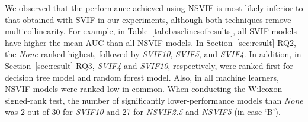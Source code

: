 We observed that the performance achieved using NSVIF is most likely inferior to that obtained with SVIF in our experiments, although both techniques remove multicollinearity.
For example, in Table~\ref{tab:baselinesofresults}, all SVIF models have higher the mean AUC than all NSVIF models. 
In Section~\ref{sec:result}-RQ2, the \emph{None} ranked highest, followed by \emph{SVIF10}, \emph{SVIF5}, and \emph{SVIF4}. In addition, in Section~\ref{sec:result}-RQ3, \emph{SVIF4} and \emph{SVIF10}, respectively, were ranked first for decision tree model and random forest model. Also, in all machine learners, NSVIF models were ranked low in common. 
When conducting the Wilcoxon signed-rank test, the number of significantly lower-performance models than \emph{None} was 2 out of 30 for \emph{SVIF10} and 27 for \emph{NSVIF2.5} and \emph{NSVIF5} (in case `B').

